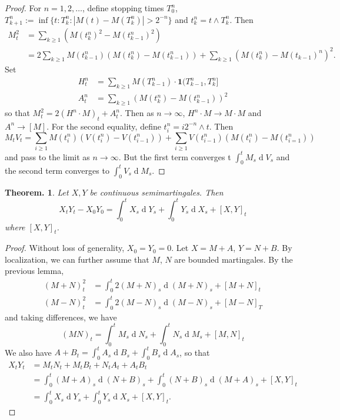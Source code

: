 \documentclass[11pt, a4paper]{memoir}
\theoremstyle{change}
\newtheorem{theorem}{Theorem.}[section]
\theoremstyle{plain}
\theoremstyle{nonumberplain}
\newtheorem{proof}{Proof}
\renewcommand{\d}[1]{\ensuremath{\operatorname{d}\!{#1}}}
\newcommand{\idc}{\mathbf{1}}
\numberwithin{equation}{section}
\begin{document}
\begin{proof}
    For $n=1,2,\ldots$, define stopping times $T_0^n$, $T_{k+1}^n:=\inf\{t:T_k^n:|M(t)-M(T_k^n)|>2^{-n}\}$ and $t_k^n=t\wedge T_k^n$.
    Then
    \begin{align*}
        M_t^2 &= \sum_{k\geq 1}(M(t_k^n)^2-M(t_{k-1}^n)^2)\\
              &= 2\sum_{k\geq 1}M(t_{k-1}^n)(M(t_k^n)-M(t_{k-1}^n))+\sum_{k\geq 1}(M(t_k^n)-M(t_{k-1})^n)^2.
    \end{align*}
    Set
    \begin{align*}
        H_t^n &= \sum_{k\geq 1}M(T_{k-1}^n)\cdot\idc{(T_{k-1}^n,T_k^n]}\\
        A_t^n &= \sum_{k\geq 1}(M(t_k^n)-M(t_{k-1}^n))^2
    \end{align*}
    so that $M_t^2=2(H^n\cdot M)_t+A_t^n$.
    Then as $n\to\infty$, $H^n\cdot M\to M\cdot M$ and $A^n\to [M]$.
    For the second equality, define $t_i^n=i2^{-n}\wedge t$.
    Then
    \begin{equation*}
        M_tV_t = \sum_{i\geq 1}M(t_i^n)(V(t_i^n)-V(t_{i-1}^n))+\sum_{i\geq 1}V(t_{i-1}^n)(M(t_i^n)-M(t_{i=1}^n))
    \end{equation*}
    and pass to the limit as $n\to\infty$.
    But the first term converges t $\int_0^t M_s\d{V_s}$ and the second term converges to $\int_0^t V_s\d{M_s}$.
\end{proof}
\begin{theorem}
    Let $X,Y$ be continuous semimartingales.
    Then
    \begin{equation*}
        X_tY_t-X_0Y_0=\int_0^tX_s\d{Y_s}+\int_0^t Y_s\d{X_s}+[X,Y]_t
    \end{equation*}
    where $[X,Y]_t$.
\end{theorem}
\begin{proof}
    Without loss of generality, $X_0=Y_0=0$.
    Let $X=M+A$, $Y=N+B$.
    By localization, we can further assume that $M$, $N$ are bounded martingales.
    By the previous lemma,
    \begin{align*}
        (M+N)_t^2 &= \int_0^t2(M+N)_s\d{(M+N)_s}+[M+N]_t\\
        (M-N)_t^2 &= \int_0^t 2(M-N)_s\d{(M-N)_s}+[M-N]_T
    \end{align*}
    and taking differences, we have
    \begin{equation*}
        (MN)_t = \int_0^t M_s\d{N_s} + \int_0^t N_s\d{M_s}+[M,N]_t
    \end{equation*}
    We also have $A+B_t=\int_0^tA_s\d{B_s}+\int_0^t B_s\d{A_s}$, so that
    \begin{align*}
        X_tY_t &= M_tN_t + M_tB_t+N_tA_t+A_tB_t\\
               &= \int_0^t(M+A)_s\d{(N+B)_s}+\int_0^t(N+B)_s\d{(M+A)_s}+[X,Y]_t\\
               &= \int_0^t X_s\d{Y_s}+\int_0^t Y_s\d{X_s}+[X,Y]_t.
    \end{align*}
\end{proof}
\end{document}
